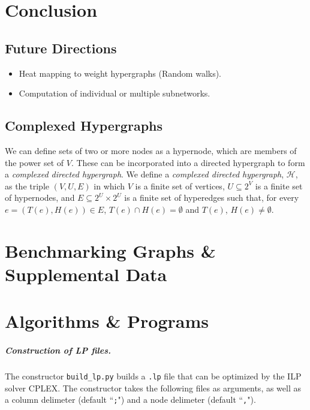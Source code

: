\documentclass[12pt,twoside]{reedthesis}
\theoremstyle{definition}
\begin{document}
\chapter*{Conclusion}
	\setcounter{chapter}{5}
	\setcounter{section}{0}

  \section{Future Directions}
   \begin{itemize}
     \item{Heat mapping to weight hypergraphs (Random walks).}
     \item{Computation of individual or multiple subnetworks.}
   \end{itemize}

   \section{Complexed Hypergraphs}

   We can define sets of two or more nodes as a hypernode, which are members of the power set of $V$.  These can be incorporated into a directed hypergraph to form a \textit{complexed directed hypergraph}.  We define a \textit{complexed directed hypergraph}, $\mathcal{H}$, as the triple $(V,U,E)$ in which $V$ is a finite set of vertices, $U \subseteq 2^V$ is a finite set of hypernodes, and $E \subseteq 2^U \times 2^U$ is a finite set of hyperedges such that, for every $e=(T(e),H(e)) \in E$, $T(e) \cap H(e) = \emptyset$ and $T(e)$, $H(e) \neq \emptyset$.\par


    \appendix
      \chapter{Benchmarking Graphs \& Supplemental Data}

      \chapter{Algorithms \& Programs}

        \paragraph{Construction of LP files.}The constructor \verb|build_lp.py| builds a \texttt{.lp} file that can be optimized by the ILP solver CPLEX. The constructor takes the following files as arguments, as well as a column delimeter (default ``\texttt{;}") and a node delimeter (default ``\texttt{,}").
\end{document}
